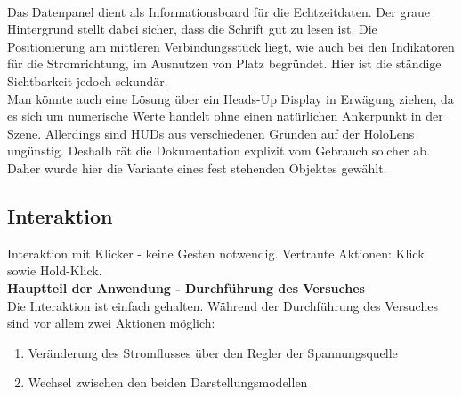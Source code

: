 \vspace{8px}
\begin{center}
	\\
\end{center}
\vspace{6px}

Das Datenpanel dient als Informationsboard für die Echtzeitdaten. Der graue Hintergrund stellt dabei sicher, dass die Schrift gut zu lesen ist. Die Positionierung am mittleren Verbindungsstück liegt, wie auch bei den Indikatoren für die Stromrichtung, im Ausnutzen von Platz begründet. Hier ist die ständige Sichtbarkeit jedoch sekundär.\\

Man könnte auch eine Lösung über ein Heads-Up Display in Erwägung ziehen, da es sich um numerische Werte handelt ohne einen natürlichen Ankerpunkt in der Szene. Allerdings sind HUDs aus verschiedenen Gründen auf der HoloLens ungünstig. Deshalb rät die Dokumentation explizit vom Gebrauch solcher ab. Daher wurde hier die Variante eines fest stehenden Objektes gewählt.\\

\subsection{Interaktion}
Interaktion mit Klicker - keine Gesten notwendig. Vertraute Aktionen: Klick sowie Hold-Klick.\\
\textbf{Hauptteil der Anwendung - Durchführung des Versuches}\\
Die Interaktion ist einfach gehalten. Während der Durchführung des Versuches sind vor allem zwei Aktionen möglich:
\begin{enumerate}[topsep=-2px]
	\setlength{\itemsep}{-5pt}
	\item Veränderung des Stromflusses über den Regler der Spannungsquelle
	\item Wechsel zwischen den beiden Darstellungsmodellen
\end{enumerate}
\vspace{4px}

